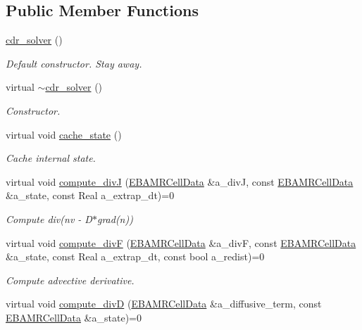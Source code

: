 \subsection*{Public Member Functions}
\begin{DoxyCompactItemize}
\item 
\hyperlink{classcdr__solver_a769c300e45653e006b7908a141a30f3e}{cdr\+\_\+solver} ()
\begin{DoxyCompactList}\small\item\em Default constructor. Stay away. \end{DoxyCompactList}\item 
virtual \hyperlink{classcdr__solver_a8f586f2f35454c481c28a2defdc4846f}{$\sim$cdr\+\_\+solver} ()
\begin{DoxyCompactList}\small\item\em Constructor. \end{DoxyCompactList}\item 
virtual void \hyperlink{classcdr__solver_a72f18ba39bd5d4f9d1b49f73176a5504}{cache\+\_\+state} ()
\begin{DoxyCompactList}\small\item\em Cache internal state. \end{DoxyCompactList}\item 
virtual void \hyperlink{classcdr__solver_a33a7c33663066833a4f248b41eff7909}{compute\+\_\+divJ} (\hyperlink{type__definitions_8H_a7e610f301989e5e07781c5e338bdb7c3}{E\+B\+A\+M\+R\+Cell\+Data} \&a\+\_\+divJ, const \hyperlink{type__definitions_8H_a7e610f301989e5e07781c5e338bdb7c3}{E\+B\+A\+M\+R\+Cell\+Data} \&a\+\_\+state, const Real a\+\_\+extrap\+\_\+dt)=0
\begin{DoxyCompactList}\small\item\em Compute div(nv -\/ D$\ast$grad(n)) \end{DoxyCompactList}\item 
virtual void \hyperlink{classcdr__solver_a0543358b07bbdd24dc5d6944a2522858}{compute\+\_\+divF} (\hyperlink{type__definitions_8H_a7e610f301989e5e07781c5e338bdb7c3}{E\+B\+A\+M\+R\+Cell\+Data} \&a\+\_\+divF, const \hyperlink{type__definitions_8H_a7e610f301989e5e07781c5e338bdb7c3}{E\+B\+A\+M\+R\+Cell\+Data} \&a\+\_\+state, const Real a\+\_\+extrap\+\_\+dt, const bool a\+\_\+redist)=0
\begin{DoxyCompactList}\small\item\em Compute advective derivative. \end{DoxyCompactList}\item 
virtual void \hyperlink{classcdr__solver_aa21107774b821fa8c522623d0fa88794}{compute\+\_\+divD} (\hyperlink{type__definitions_8H_a7e610f301989e5e07781c5e338bdb7c3}{E\+B\+A\+M\+R\+Cell\+Data} \&a\+\_\+diffusive\+\_\+term, const \hyperlink{type__definitions_8H_a7e610f301989e5e07781c5e338bdb7c3}{E\+B\+A\+M\+R\+Cell\+Data} \&a\+\_\+state)=0

\end{DoxyCompactItemize}
